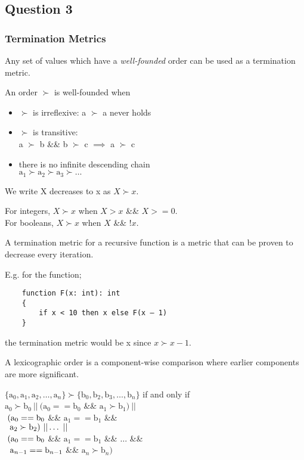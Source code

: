 \subsection{Question 3}
\subsubsection{Termination Metrics}
Any set of values which have a \textit{well-founded} order can be used as a termination metric.

An order $\succ$ is well-founded when
\begin{itemize}
    \item $\succ$ is irreflexive: a $\succ$ a never holds
    \item $\succ$ is transitive:\\
        \tab a $\succ$ b \&\& b $\succ$ c $\implies$ a $\succ$ c
    \item there is no infinite descending chain\\
        \tab $\text{a}_1 \succ \text{a}_2  \succ \text{a}_3  \succ \dots$
\end{itemize}

We write X decreases to x as $X \succ x$.

For integers, $X \succ x$ when $X > x$ \&\& $X >= 0$. \\
For booleans, $X \succ x$ when $X$ \&\& $!x$.

A termination metric for a recursive function is a metric that can be proven to decrease every iteration.

E.g. for the function;
\begin{verbatim}
    function F(x: int): int 
    { 
        if x < 10 then x else F(x – 1)
    }
\end{verbatim}
the termination metric would be x since $x \succ x - 1$.

A lexicographic order is a component-wise comparison where earlier components are more significant.

$\{\text{a}_0, \text{a}_1, \text{a}_2, \dots, \text{a}_n\} \succ \{\text{b}_0, \text{b}_2, \text{b}_3, \dots, \text{b}_n\}$ if and only if\\
$\text{a}_0 \succ \text{b}_0\ ||\ (\text{a}_0 == \text{b}_0$ \&\& $\text{a}_1 \succ \text{b}_1)\ ||$\\
$\hspace*{0.1cm} (\text{a}_0 == \text{b}_0$ \&\& $\text{a}_1 == \text{b}_1$ \&\&\\
$\tab \tab \text{a}_2 \succ \text{b}_2)\ || \dots\ ||$\\
$\hspace*{0.1cm} (\text{a}_0 == \text{b}_0$ \&\& $\text{a}_1 == \text{b}_1$ \&\& $\dots$ \&\&\\
$\tab \tab \text{a}_{n-1} == \text{b}_{n-1}$ \&\& $\text{a}_n \succ \text{b}_n)$

